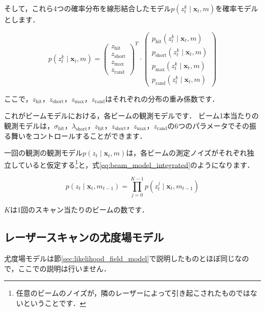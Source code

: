 \documentclass[{../../master}]{subfiles}
\begin{document}
そして，これら4つの確率分布を線形結合したモデル$p(z^{k}_{t} \mid \bm{x}_{t}, m)$を確率モデルとします．

\begin{equation}
  p(z^{k}_{t} \mid \bm{x}_{t}, m) =
  \begin{pmatrix}
    z_{\text{hit}} \\
    z_{\text{short}} \\
    z_{\text{max}} \\
    z_{\text{rand}}
  \end{pmatrix}^T
  \cdot
  \begin{pmatrix}
    p_{\text{hit}}(z^{k}_{t} \mid \bm{x}_{t}, m) \\
    p_{\text{short}}(z^{k}_{t} \mid \bm{x}_{t}, m) \\
    p_{\text{max}}(z^{k}_{t} \mid \bm{x}_{t}, m) \\
    p_{\text{rand}}(z^{k}_{t} \mid \bm{x}_{t}, m)
  \end{pmatrix}
  \label{eq:beam_model_p}
\end{equation}

ここで，$z_{\text{hit}}$，$z_{\text{short}}$，$z_{\text{max}}$，$z_{\text{rand}}$はそれぞれの分布の重み係数です．

これがビームモデルにおける，各ビームの観測モデルです．
ビーム1本当たりの観測モデルは，$\sigma_{\text{hit}}$，$\lambda_{\text{short}}$，$z_{\text{hit}}$，$z_{\text{short}}$，$z_{\text{max}}$，$z_{\text{rand}}$の6つのパラメータでその振る舞いをコントロールすることができます．

一回の観測の観測モデル$p(z_{t} \mid \bm{x}_{t}, m)$は，各ビームの測定ノイズがそれぞれ独立していると仮定する\footnote{任意のビームのノイズが，隣のレーザーによって引き起こされたものではないということです．}と，式\ref{eq:beam_model_integrated}のようになります．

\begin{equation}
  p(z_{t} \mid \bm{x}_{t}, m_{t-1}) = \prod_{j=0}^{K-1} p(z_{t}^{j} \mid \bm{x}_{t}, m_{t-1})
  \label{eq:beam_model_integrated}
\end{equation}

$K$は1回のスキャン当たりのビームの数です．

\subsection{レーザースキャンの尤度場モデル}

尤度場モデルは節\ref{sec:likelihood_field_model}で説明したものとほぼ同じなので，ここでの説明は行いません．
\end{document}
